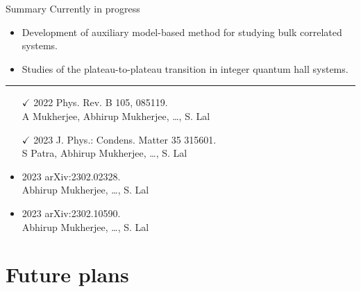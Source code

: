\documentclass[aspectratio=169,t]{beamer}
\begin{document}
\begin{frame}{Summary}
\alert{Currently in progress}\\
\begin{itemize}
	\item Development of auxiliary model-based method for studying bulk correlated systems.\\[10pt]
	\item Studies of the plateau-to-plateau transition in integer quantum hall systems.
\end{itemize}

\vspace*{\fill}
\hrule

\vspace*{\fill}
\begin{minipage}{0.55\textwidth}
\begin{itemize}
	\item[$\checkmark$] 2022 \alert{Phys. Rev. B} 105, 085119.\\ A Mukherjee, \alert{Abhirup Mukherjee}, \ldots, S. Lal\\[10pt]
	\item[$\checkmark$] 2023 \alert{J. Phys.: Condens. Matter} 35 315601.\\ S Patra, \alert{Abhirup Mukherjee}, \ldots, S. Lal
\end{itemize}
\end{minipage}
\begin{minipage}{0.44\textwidth}
\begin{itemize}
	\item 2023 \alert{arXiv:2302.02328}.\\ \alert{Abhirup Mukherjee}, \ldots, S. Lal\\[10pt]
	\item 2023 \alert{arXiv:2302.10590}.\\ \alert{Abhirup Mukherjee}, \ldots, S. Lal
\end{itemize}
\end{minipage}

\end{frame}

\section{Future plans}
\subsection{~}
\end{document}
